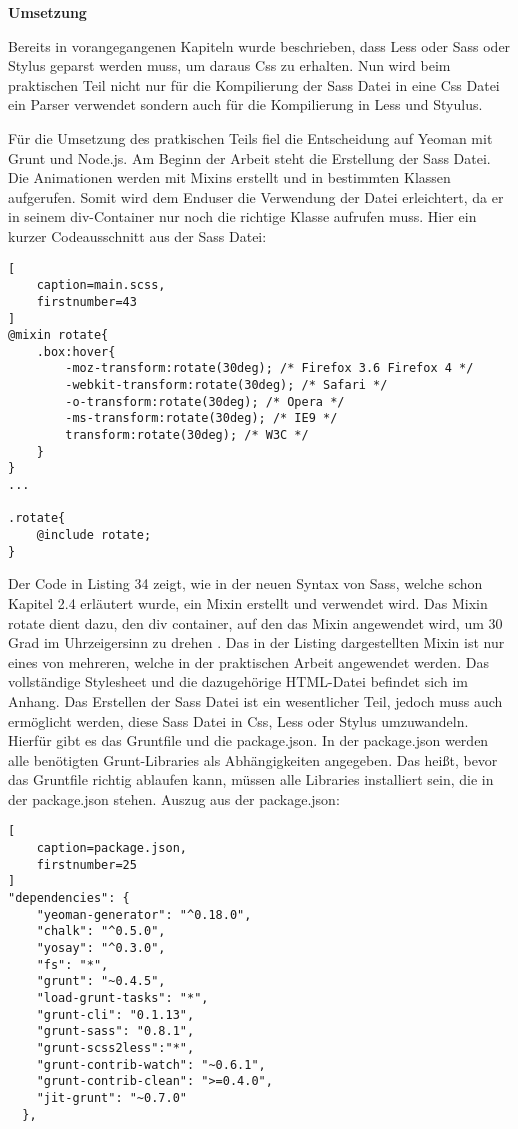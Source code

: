 \textbf{Umsetzung}

Bereits in vorangegangenen Kapiteln wurde beschrieben, dass Less oder Sass oder Stylus geparst werden muss, um daraus Css zu erhalten. Nun wird beim praktischen Teil nicht nur für die Kompilierung der Sass Datei in eine Css Datei ein Parser verwendet sondern auch für die Kompilierung in Less und Styulus.

Für die Umsetzung des pratkischen Teils fiel die Entscheidung auf  Yeoman mit Grunt und Node.js.\newline
Am Beginn der Arbeit steht die Erstellung der Sass Datei. Die Animationen werden mit Mixins erstellt und in bestimmten Klassen aufgerufen. Somit wird dem Enduser die Verwendung der Datei erleichtert, da er in seinem div-Container nur noch die richtige Klasse aufrufen muss.
Hier ein kurzer Codeausschnitt aus der Sass Datei:
\begin{lstlisting}[
	caption=main.scss,
	firstnumber=43
]
@mixin rotate{
	.box:hover{
		-moz-transform:rotate(30deg); /* Firefox 3.6 Firefox 4 */
		-webkit-transform:rotate(30deg); /* Safari */
		-o-transform:rotate(30deg); /* Opera */
		-ms-transform:rotate(30deg); /* IE9 */
		transform:rotate(30deg); /* W3C */
	}
}
...

.rotate{
	@include rotate;
}

\end{lstlisting}
Der Code in Listing 34 zeigt, wie in der neuen Syntax von Sass, welche schon Kapitel 2.4 erläutert wurde, ein Mixin erstellt und verwendet wird. \newline
Das Mixin rotate dient dazu, den div container, auf den das Mixin angewendet wird, um 30 Grad im Uhrzeigersinn zu drehen . Das in der Listing dargestellten Mixin ist nur eines von mehreren, welche in der praktischen Arbeit angewendet werden. Das vollständige Stylesheet und die dazugehörige HTML-Datei befindet sich im Anhang. \newline\newline
Das Erstellen der Sass Datei ist ein wesentlicher Teil, jedoch muss auch ermöglicht werden, diese Sass Datei in Css, Less oder Stylus umzuwandeln. Hierfür gibt es das Gruntfile und die package.json.
In der package.json werden alle benötigten Grunt-Libraries als Abhängigkeiten angegeben. Das heißt, bevor das Gruntfile richtig ablaufen kann, müssen alle Libraries installiert sein, die in der package.json stehen.\newline
Auszug aus der package.json:
\begin{lstlisting}[
	caption=package.json,
	firstnumber=25
]
"dependencies": {
    "yeoman-generator": "^0.18.0",
    "chalk": "^0.5.0",
    "yosay": "^0.3.0",
    "fs": "*",
    "grunt": "~0.4.5",
    "load-grunt-tasks": "*",
    "grunt-cli": "0.1.13",
    "grunt-sass": "0.8.1",
    "grunt-scss2less":"*",
    "grunt-contrib-watch": "~0.6.1",
    "grunt-contrib-clean": ">=0.4.0",
    "jit-grunt": "~0.7.0"
  },
\end{lstlisting}
